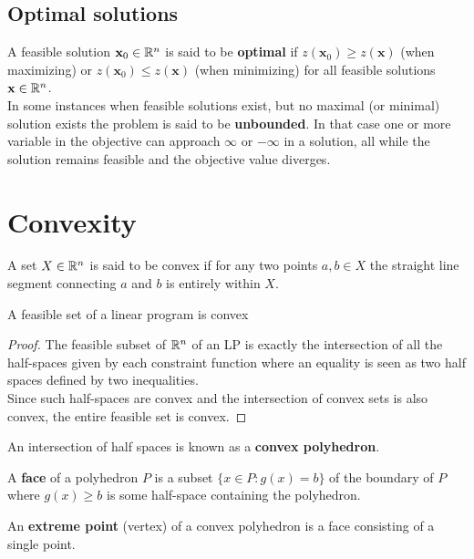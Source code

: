 \subsection{Optimal solutions}
A feasible solution $\textbf{x}_0 \in \mathbb{R}^n$ is said to be \textbf{optimal} if $z(\textbf{x}_0) \geq z(\textbf{x})$ (when maximizing) or $z(\textbf{x}_0) \leq z(\textbf{x})$ (when minimizing) for all feasible solutions $\textbf{x} \in \mathbb{R}^n$.\\
In some instances when feasible solutions exist, but no maximal (or minimal) solution exists the problem is said to be \textbf{unbounded}. In that case one or more variable in the objective can approach $\infty$ or $-\infty$ in a solution, all while the solution remains feasible and the objective value diverges.
\section{Convexity}
\begin{definition}\label{convex}
A set $X \in \mathbb{R}^n$ is said to be convex if for any two points $a, b \in X$ the straight line segment 
connecting $a$ and $b$ is entirely within $X$.
\end{definition}
\begin{theorem}
A feasible set of a linear program is convex
\begin{proof}
The feasible subset of $\mathbb{R}^n$ of an LP is exactly the intersection of all the half-spaces given by each constraint function where an equality is seen as two half spaces defined by two inequalities. \\
Since such half-spaces are convex and the intersection of convex sets is also convex, the entire feasible set is convex.
\end{proof}
\end{theorem}
\begin{definition}
An intersection of half spaces is known as a \textbf{convex polyhedron}. 
\end{definition}
\begin{definition}
A \textbf{face} of a polyhedron $P$ is a subset $\{x\in P:g(x)=b\}$ of the boundary of $P$ where $g(x) \geq b$ is some half-space containing the polyhedron. 
\end{definition}
\begin{definition}
An \textbf{extreme point} (vertex) of a convex polyhedron is a face consisting of a single point.
\end{definition}
